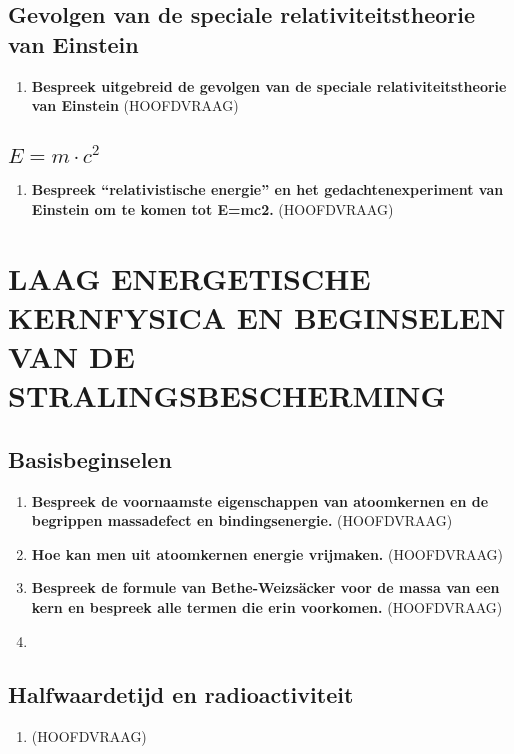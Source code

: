 \documentclass[12pt]{article}
\begin{document}
    \subsection{Gevolgen van de speciale relativiteitstheorie van Einstein}
    \begin{enumerate}
        \item \textbf{Bespreek uitgebreid de gevolgen van de speciale relativiteitstheorie van Einstein} (HOOFDVRAAG)
    \end{enumerate}
    \subsection{$E=m \cdot c^2$}
    \begin{enumerate}
        \item \textbf{Bespreek “relativistische energie” en het gedachtenexperiment van Einstein om te komen tot E=mc2.} (HOOFDVRAAG)
    \end{enumerate}



    \section{LAAG ENERGETISCHE KERNFYSICA EN BEGINSELEN VAN DE STRALINGSBESCHERMING}
    \subsection{Basisbeginselen}
    \begin{enumerate}
        \item \textbf{Bespreek de voornaamste eigenschappen van atoomkernen en de begrippen massadefect en bindingsenergie.} (HOOFDVRAAG)
        \item \textbf{Hoe kan men uit atoomkernen energie vrijmaken.} (HOOFDVRAAG)
        \item \textbf{Bespreek de formule van Bethe-Weizsäcker voor de massa van een kern en bespreek alle termen die erin voorkomen.} (HOOFDVRAAG)
        \item 
    \end{enumerate}
    \subsection{Halfwaardetijd en radioactiviteit}
    \begin{enumerate}
        \item \textbf{} (HOOFDVRAAG)
    \end{enumerate}
\end{document}
